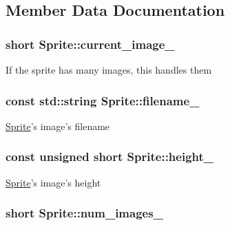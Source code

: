 \subsection{Member Data Documentation}
\hypertarget{classSprite_a8654a8729656ba13695c20c2030de5d0}{
\subsubsection[{current\-\_\-image\-\_\-}]{\setlength{\rightskip}{0pt plus 5cm}short Sprite\-::current\-\_\-image\-\_\-\hspace{0.3cm}{\ttfamily [protected]}}}\label{classSprite_a8654a8729656ba13695c20c2030de5d0}
If the sprite has many images, this handles them \hypertarget{classSprite_aaa19414e23ba5ea1b20bd8a04281a9f0}{
\subsubsection[{filename\-\_\-}]{\setlength{\rightskip}{0pt plus 5cm}const std\-::string Sprite\-::filename\-\_\-\hspace{0.3cm}{\ttfamily [private]}}}\label{classSprite_aaa19414e23ba5ea1b20bd8a04281a9f0}
\hyperlink{classSprite}{Sprite}'s image's filename \hypertarget{classSprite_ae2ddd489c30852d32b7a88d20af9df1e}{
\subsubsection[{height\-\_\-}]{\setlength{\rightskip}{0pt plus 5cm}const unsigned short Sprite\-::height\-\_\-\hspace{0.3cm}{\ttfamily [protected]}}}\label{classSprite_ae2ddd489c30852d32b7a88d20af9df1e}
\hyperlink{classSprite}{Sprite}'s image's height \hypertarget{classSprite_a5a6ae065c674bfb85b6d90c1cbfcdca2}{
\subsubsection[{num\-\_\-images\-\_\-}]{\setlength{\rightskip}{0pt plus 5cm}short Sprite\-::num\-\_\-images\-\_\-\hspace{0.3cm}{\ttfamily [protected]}}}\label{classSprite_a5a6ae065c674bfb85b6d90c1cbfcdca2}

